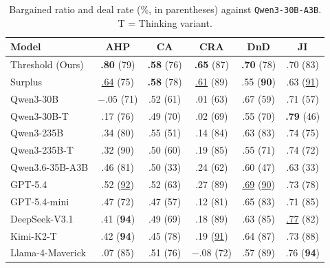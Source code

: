 \documentclass[11pt]{article}
\newcommand{\model}[1]{\texttt{#1}}
\newcommand{\lightrule}{\arrayrulecolor{black!20}\midrule\arrayrulecolor{black}}
\begin{document}
\begin{table}[t]
\centering
\scriptsize
\setlength{\tabcolsep}{3pt}
\renewcommand{\arraystretch}{1.15}
\begin{tabular}{l c c c c c}
\toprule
\rowcolor{tableheader}
\textbf{Model} & \textbf{AHP} & \textbf{CA} & \textbf{CRA} & \textbf{DnD} & \textbf{JI} \\
\midrule
\rowcolor{tablerow}
Threshold (Ours) & \textbf{.80} (79) & \textbf{.58} (76) & \textbf{.65} (87) & \textbf{.70} (78) & .70 (83) \\
Surplus  & \underline{.64} (75)          & \textbf{.58} (78) & \underline{.61} (89) & .55 (\textbf{90}) & .63 (\underline{91}) \\
\lightrule
\rowcolor{tablerow}
Qwen3-30B        & $-.05$ (71)       & .52 (61)          & .01 (63)       & .67 (59)          & .71 (57)          \\
Qwen3-30B-T      & .17 (76)          & .49 (70)          & .02 (69)          & .55 (70)          & \textbf{.79} (46) \\
\rowcolor{tablerow}
Qwen3-235B       & .34 (80)          & .55 (51)          & .14 (84)          & .63 (83)          & .74 (75)          \\
Qwen3-235B-T     & .32 (90)          & .50 (60)          & .19 (85)          & .55 (71)          & .74 (72)          \\
\rowcolor{tablerow}
Qwen3.6-35B-A3B  & .46 (81)          & .50 (33)          & .24 (62)          & .60 (47)          & .63 (33)          \\
GPT-5.4          & .52 (\underline{92}) & .52 (63) & .27 (89) & \underline{.69} (\underline{90}) & .73 (78) \\
\rowcolor{tablerow}
GPT-5.4-mini     & .47 (72)          & .47 (57)          & .12 (81)          & .65 (83)          & .71 (85)          \\
DeepSeek-V3.1    & .41 (\textbf{94}) & .49 (69)          & .18 (89)          & .63 (85)          & \underline{.77} (82) \\
\rowcolor{tablerow}
Kimi-K2-T        & .42 (\textbf{94}) & .45 (78)          & .19 (\underline{91}) & .64 (87)       & .73 (88)          \\
Llama-4-Maverick      & .07 (85)      & .51 (76)          & $-.08$ (72)       & .57 (89)          & .76 (\textbf{94}) \\
\bottomrule
\end{tabular}

\caption{Bargained ratio and deal rate (\%, in parentheses) against \model{Qwen3-30B-A3B}. T = Thinking variant.}
\label{tab:results-qwen}
\end{table}
\end{document}
